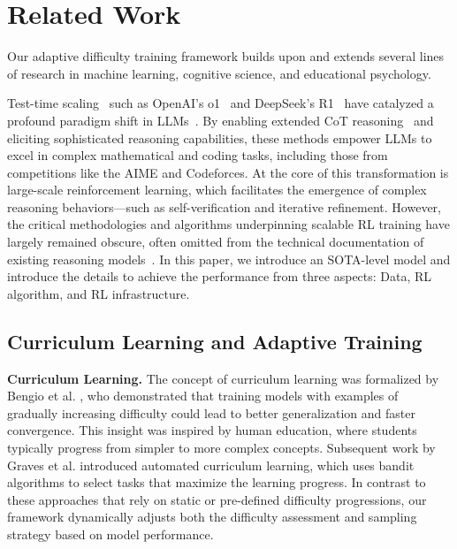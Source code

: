 \section{Related Work}

Our adaptive difficulty training framework builds upon and extends several lines of research in machine learning, cognitive science, and educational psychology.





Test-time scaling~\cite{qwq,grok,gemini-thinking,claude3.7} such as OpenAI’s o1~\cite{o1} and DeepSeek’s R1~\cite{r1} have catalyzed a profound paradigm shift in LLMs~\cite{gpt3,gpt4}. By enabling extended CoT reasoning~\cite{cot} and eliciting sophisticated reasoning capabilities, these methods empower LLMs to excel in complex mathematical and coding tasks, including those from competitions like the AIME and Codeforces.
At the core of this transformation is large-scale reinforcement learning, which facilitates the emergence of complex reasoning behaviors—such as self-verification and iterative refinement. 
However, the critical methodologies and algorithms underpinning scalable RL training have largely remained obscure, often omitted from the technical documentation of existing reasoning models~\cite{o1,r1,gpt3,gpt4,cot}.
In this paper, we introduce an SOTA-level model \method and introduce the details to achieve the performance from three aspects: Data, RL algorithm, and RL infrastructure.

\subsection{Curriculum Learning and Adaptive Training}

\textbf{Curriculum Learning.} The concept of curriculum learning was formalized by Bengio et al. \citep{bengio2009curriculum}, who demonstrated that training models with examples of gradually increasing difficulty could lead to better generalization and faster convergence. This insight was inspired by human education, where students typically progress from simpler to more complex concepts. Subsequent work by Graves et al. \citep{graves2017automated} introduced automated curriculum learning, which uses bandit algorithms to select tasks that maximize the learning progress. In contrast to these approaches that rely on static or pre-defined difficulty progressions, our framework dynamically adjusts both the difficulty assessment and sampling strategy based on model performance.

